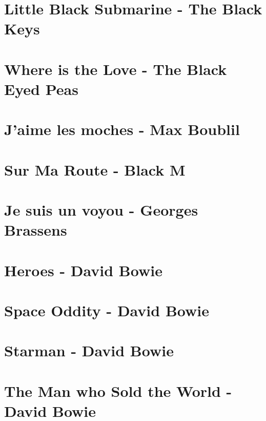 \documentclass[11pt]{article}
\begin{document}
\section{Little Black Submarine - The Black Keys}
\begin{guitar}

\end{guitar}



\section{Where is the Love - The Black Eyed Peas}


\section{J'aime les moches - Max Boublil}


\section{Sur Ma Route - Black M}
\begin{guitar}

\end{guitar}

\section{Je suis un voyou - Georges Brassens}
\begin{guitar}

\end{guitar}


\section{Heroes - David Bowie}


\section*{Space Oddity - David Bowie}
\section*{Starman - David Bowie}


\section*{The Man who Sold the World - David Bowie}

\end{document}
